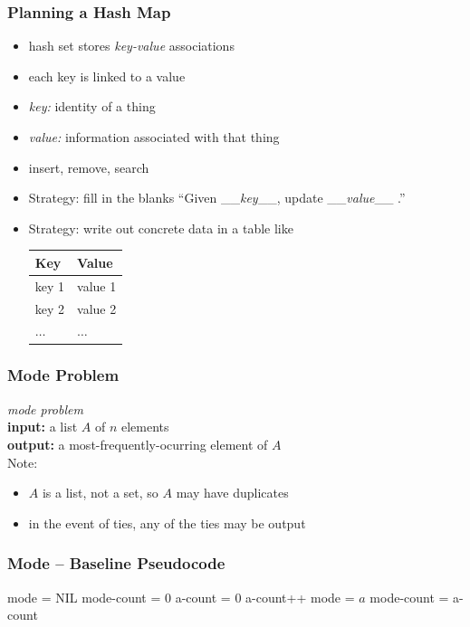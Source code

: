 \documentclass[10pt]{beamer}
\begin{document}
\begin{frame} \frametitle{Planning a Hash Map}
\begin{itemize}
  \item hash set stores \emph{key-value} associations
  \item each key is linked to a value
  \item \emph{key:} identity of a thing
  \item \emph{value:} information associated with that thing
  \item insert, remove, search
  \item Strategy: fill in the blanks ``Given \_\_\emph{key}\_\_, update \_\_\emph{value}\_\_ .''
  \item Strategy: write out concrete data in a table like
  \begin{center}
    \begin{tabular}{ll}
      \textbf{Key} & \textbf{Value} \\ \hline
      key 1 & value 1 \\
      key 2 & value 2 \\
      $\ldots$ & $\ldots$ 
    \end{tabular}
  \end{center}
\end{itemize}
\end{frame}


\begin{frame} \frametitle{Mode Problem}
  \emph{mode problem} \\
  \textbf{input:} a list $A$ of $n$ elements\\
  \textbf{output:} a most-frequently-ocurring element of $A$ \\

  \vspace{24pt}
  Note:
  \begin{itemize}
    \item $A$ is a list, not a set, so $A$ may have duplicates
    \item in the event of ties, any of the ties may be output
  \end{itemize}
\end{frame}


\begin{frame} \frametitle{Mode -- Baseline Pseudocode}
  {\footnotesize
  \begin{algorithmic}[1]
    \State mode = NIL
    \State mode-count = 0
      \State a-count = 0
          \State a-count++
        \EndIf
      \EndFor
        \State mode = $a$
        \State mode-count = a-count
      \EndIf
    \EndFor
    \State {}
    \EndFunction
  \end{algorithmic}
  }
\end{frame}
\end{document}

